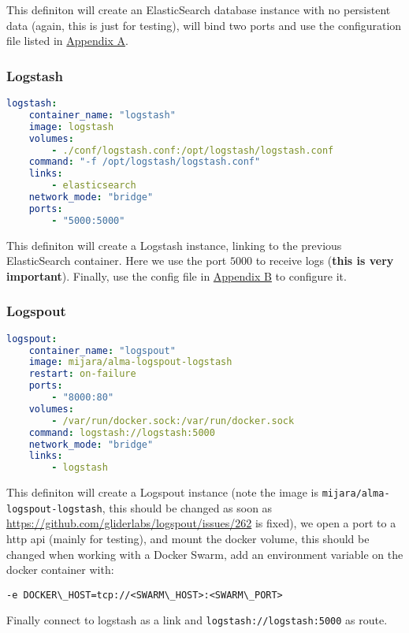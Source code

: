 This definiton will create an ElasticSearch database instance with no persistent data (again, this is just for testing), will bind two ports and use the configuration file listed in \hyperref[sec:appendix-a]{Appendix A}.

\subsubsection{Logstash}

\begin{lstlisting}[language=yaml]
logstash:
    container_name: "logstash"
    image: logstash
    volumes:
        - ./conf/logstash.conf:/opt/logstash/logstash.conf
    command: "-f /opt/logstash/logstash.conf"
    links:
        - elasticsearch
    network_mode: "bridge"
    ports:
        - "5000:5000"
\end{lstlisting}

This definiton will create a Logstash instance, linking to the previous ElasticSearch container. Here we use the port $5000$ to receive logs (\textbf{this is very important}). Finally, use the config file in \hyperref[sec:appendix-b]{Appendix B} to configure it.

\subsubsection{Logspout}

\begin{lstlisting}[language=yaml]
logspout:
    container_name: "logspout"
    image: mijara/alma-logspout-logstash
    restart: on-failure
    ports:
        - "8000:80"
    volumes:
        - /var/run/docker.sock:/var/run/docker.sock
    command: logstash://logstash:5000
    network_mode: "bridge"
    links:
        - logstash
\end{lstlisting}

This definiton will create a Logspout instance (note the image is \texttt{mijara/alma-logspout-logstash}, this should be changed as soon as \url{https://github.com/gliderlabs/logspout/issues/262} is fixed), we open a port to a http api (mainly for testing), and mount the docker volume, this should be changed when working with a Docker Swarm, add an environment variable on the docker container with:

\begin{lstlisting}
-e DOCKER\_HOST=tcp://<SWARM\_HOST>:<SWARM\_PORT>
\end{lstlisting}

Finally connect to logstash as a link and \texttt{logstash://logstash:5000} as route.

